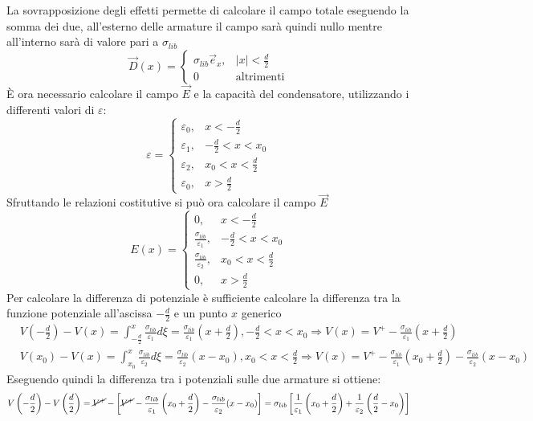 La sovrapposizione degli effetti permette di calcolare il campo
totale eseguendo la somma dei due, all'esterno delle armature
il campo sarà quindi nullo mentre all'interno sarà di valore pari
a $\sigma_{lib}$
$$
\vec{D}(x) = \begin{cases}
\sigma_{lib} \vec{e}_x, & |x|<\frac{d}{2}\\
0 & \text{altrimenti}
\end{cases}
$$
È ora necessario calcolare il campo $\vec{E}$ e la capacità del 
condensatore, utilizzando i differenti valori di $\varepsilon$:
$$
\varepsilon = \begin{cases}
\varepsilon_0, & x< -\frac{d}{2}\\
\varepsilon_1, & -\frac{d}{2} < x < x_0 \\
\varepsilon_2, & x_0 < x < \frac{d}{2}\\
\varepsilon_0, & x>\frac{d}{2}
\end{cases}
$$
Sfruttando le relazioni costitutive si può ora calcolare
il campo $\vec{E}$
$$
E(x) = \begin{cases}
0, & x < -\frac{d}{2} \\
\frac{\sigma_{lib}}{\varepsilon_1}, & -\frac{d}{2} < x < x_0\\
\frac{\sigma_{lib}}{\varepsilon_2}, & x_0 < x < \frac{d}{2}\\
0, & x > \frac{d}{2}
\end{cases}
$$
Per calcolare la differenza di potenziale è sufficiente calcolare la 
differenza tra la funzione potenziale all'ascissa $-\frac{d}{2}$ e un 
punto $x$ generico
\begin{align*}
&V\left(-\frac{d}{2}\right) - V(x) = \int_{-\frac{d}{2}}^{x} \frac{\sigma_{lib}}{\varepsilon_1} d\xi = \frac{\sigma_{lib}}{\varepsilon_1}\left(x+\frac{d}{2}\right), -\frac{d}{2} < x < x_0 \Rightarrow V(x) = V^+ - \frac{\sigma_{lib}}{\varepsilon_1}\left(x + \frac{d}{2}\right)\\
&V(x_0 )- V(x) = \int_{x_0}^{x} \frac{\sigma_{lib}}{\varepsilon_2} d\xi = \frac{\sigma_{lib}}{\varepsilon_2} (x-x_0), x_0<x<\frac{d}{2}  \Rightarrow V(x) = V^+ - \frac{\sigma_{lib}}{\varepsilon_1}\left(x_0+\frac{d}{2}\right) - \frac{\sigma_{lib}}{\varepsilon_2}(x-x_0)
\end{align*}
Eseguendo quindi la differenza tra i potenziali sulle due armature si ottiene:
$$
V\left(-\frac{d}{2}\right) - V\left(\frac{d}{2}\right) = \cancel{V^+} - \left[ \cancel{V^+} -\frac{\sigma_{lib}}{\varepsilon_1}\left(x_0+\frac{d}{2}\right) - \frac{\sigma_{lib}}{\varepsilon_2} (x-x_0)\right] = \sigma_{lib} \left[\frac{1}{\varepsilon_1}\left(x_0+\frac{d}{2}\right) + \frac{1}{\varepsilon_2}\left(\frac{d}{2}-x_0\right)\right]
$$

